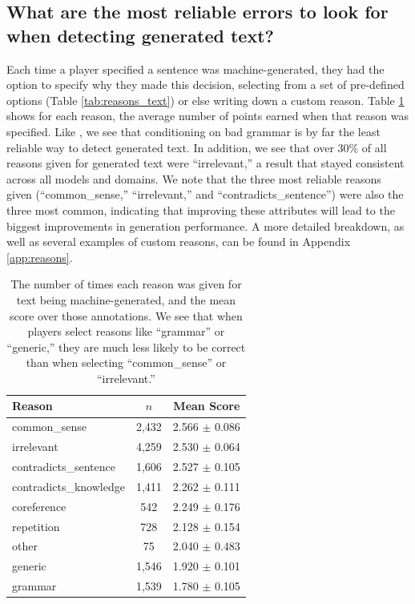 \subsection{What are the most reliable errors to look for when detecting generated text?}
\label{sec:reasons}
Each time a player specified a sentence was machine-generated, they had the option to specify why they made this decision, selecting from a set of pre-defined options (Table \ref{tab:reasons_text}) or else writing down a custom reason.
Table \ref{tab:reasons} shows for each reason, the average number of points earned when that reason was specified.
Like \citet{clark2021all}, we see that conditioning on bad grammar is by far the least reliable way to detect generated text.
In addition, we see that over 30\% of all reasons given for generated text were ``irrelevant,'' a result that stayed consistent across all models and domains.
We note that the three most reliable reasons given (``common\_sense,'' ``irrelevant,'' and ``contradicts\_sentence'') were also the three most common, indicating that improving these attributes will lead to the biggest improvements in generation performance.
A more detailed breakdown, as well as several examples of custom reasons, can be found in Appendix \ref{app:reasons}.

\begin{table}[tb]
\small
\center
\begin{tabular}{lcc} \toprule
    {Reason} & {$n$} & {Mean Score}\\ \midrule
    {common\_sense} & {2,432} & {2.566 $\pm$ 0.086} \\
    {irrelevant} & {4,259} & {2.530 $\pm$ 0.064}  \\
    {contradicts\_sentence} & {1,606} & {2.527 $\pm$ 0.105}  \\ 
    {contradicts\_knowledge} & {1,411} & {2.262 $\pm$ 0.111}   \\
    {coreference} & {542} & {2.249 $\pm$ 0.176} \\
    {repetition} & {728} & {2.128 $\pm$ 0.154} \\
    {other} & {75} & {2.040 $\pm$ 0.483} \\
    {generic} & {1,546} & {1.920 $\pm$ 0.101} \\
    {grammar} & {1,539} & {1.780 $\pm$ 0.105} \\\bottomrule
\end{tabular}
\caption{
The number of times each reason was given for text being machine-generated, and the mean score over those annotations.
We see that when players select reasons like ``grammar'' or ``generic,'' they are much less likely to be correct than when selecting ``common\_sense'' or ``irrelevant.''}
\label{tab:reasons}
\end{table}

